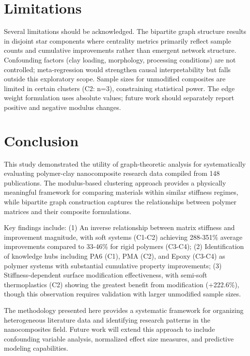 \documentclass[conference]{IEEEtran}
\begin{document}
\section{Limitations}

Several limitations should be acknowledged. The bipartite graph structure results in disjoint star components where centrality metrics primarily reflect sample counts and cumulative improvements rather than emergent network structure. Confounding factors (clay loading, morphology, processing conditions) are not controlled; meta-regression would strengthen causal interpretability but falls outside this exploratory scope. Sample sizes for unmodified composites are limited in certain clusters (C2: n=3), constraining statistical power. The edge weight formulation uses absolute values; future work should separately report positive and negative modulus changes.

\section{Conclusion}

This study demonstrated the utility of graph-theoretic analysis for systematically evaluating polymer-clay nanocomposite research data compiled from 148 publications. The modulus-based clustering approach provides a physically meaningful framework for comparing materials within similar stiffness regimes, while bipartite graph construction captures the relationships between polymer matrices and their composite formulations.

Key findings include: (1) An inverse relationship between matrix stiffness and improvement magnitude, with soft systems (C1-C2) achieving 288-351\% average improvements compared to 33-46\% for rigid polymers (C3-C4); (2) Identification of knowledge hubs including PA6 (C1), PMA (C2), and Epoxy (C3-C4) as polymer systems with substantial cumulative property improvements; (3) Stiffness-dependent surface modification effectiveness, with semi-soft thermoplastics (C2) showing the greatest benefit from modification (+222.6\%), though this observation requires validation with larger unmodified sample sizes.

The methodology presented here provides a systematic framework for organizing heterogeneous literature data and identifying research patterns in the nanocomposites field. Future work will extend this approach to include confounding variable analysis, normalized effect size measures, and predictive modeling capabilities.
\end{document}
